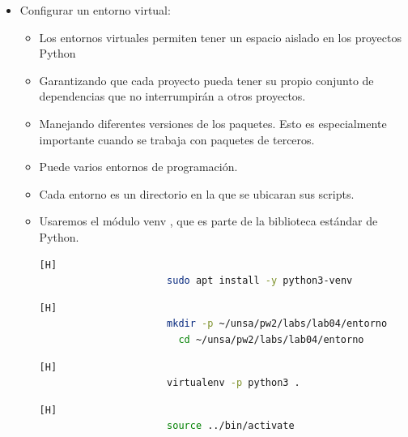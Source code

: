 \documentclass{article}
\begin{document}
\begin{itemize}
\begin{itemize}
\begin{itemize}
\begin{itemize}
\begin{lstlisting}[language=bash,caption={Paquetes y herramientas de desarrollo más para instalar para garantizar que tengamos una configuración sólida para nuestro entorno de programación:}][H]
		          sudo apt-get install build-essential libssl-dev libffi-dev python3-dev
	        \end{lstlisting}
            \end{itemize}
            \item Configurar un entorno virtual:
            \begin{itemize}
                \item Los entornos virtuales permiten tener un espacio aislado en los proyectos Python
                \item Garantizando que cada proyecto pueda tener su propio conjunto de dependencias que no interrumpirán a otros proyectos.
                \item Manejando diferentes versiones de los paquetes. Esto es especialmente importante cuando se trabaja con paquetes de terceros.
                \item Puede varios entornos de programación.
                \item Cada entorno es un directorio en la que se ubicaran sus scripts.
                \item Usaremos el módulo venv , que es parte de la biblioteca estándar de Python.
                \begin{lstlisting}[language=bash,caption={Entorno de Linux-Instalemos venv escribiendo:}][H]
    		          sudo apt install -y python3-venv
    	        \end{lstlisting}
                \begin{lstlisting}[language=bash,caption={Entorno de Linux-Para crear un ambiente elija en qué directorio.}][H]
    		          mkdir -p ~/unsa/pw2/labs/lab04/entorno
                        cd ~/unsa/pw2/labs/lab04/entorno
    	        \end{lstlisting}
                \begin{lstlisting}[language=bash,caption={Entorno de Linux-En el directorio crea un entorno virtual ejecutando el siguiente comando:}][H]
    		          virtualenv -p python3 .
    	        \end{lstlisting}
                \begin{lstlisting}[language=bash,caption={Entorno de Linux-Ejecute el script de activación para activar el entorno virtual:}][H]
    		          source ../bin/activate
    	        \end{lstlisting}
            \end{itemize}
        \end{itemize}
	\end{itemize}
	

\end{itemize}
\end{document}
